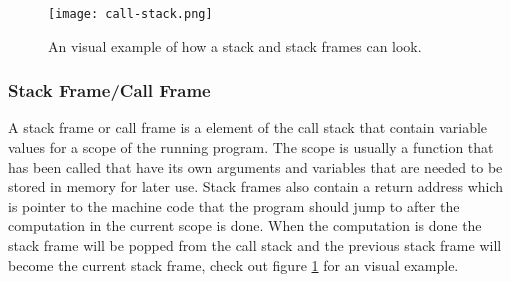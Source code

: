 \begin{figure}[h]
	\centering
	\texttt{[image: call-stack.png]}
	\caption{An visual example of how a stack and stack frames can look.}
	\label{fig:callstack}
\end{figure}


\subsubsection{Stack Frame/Call Frame}
A stack frame or call frame is a element of the call stack that contain variable values for a scope of the running program.
The scope is usually a function that has been called that have its own arguments and variables that are needed to be stored in memory for later use.
Stack frames also contain a return address which is pointer to the machine code that the program should jump to after the computation in the current scope is done.
When the computation is done the stack frame will be popped from the call stack and the previous stack frame will become the current stack frame, check out figure \ref{fig:callstack} for an visual example.

